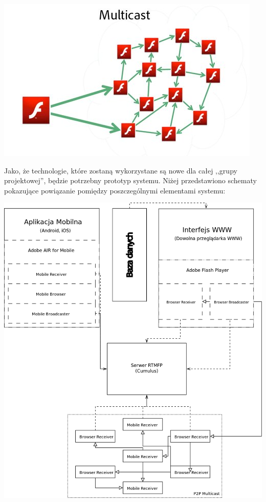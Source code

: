 \begin{center}
    \includegraphics[width=\textwidth]{img/adobe-p2p-multicast.jpg}
\end{center}

\newpage
Jako, że technologie, które zostaną wykorzystane są nowe dla całej ,,grupy projektowej'', będzie potrzebny prototyp systemu. Niżej przedstawiono schematy pokazujące powiązanie pomiędzy poszczególnymi elementami systemu:

\begin{center}
    \includegraphics[width=\textwidth]{diagramy/architektura.png}
\end{center}

